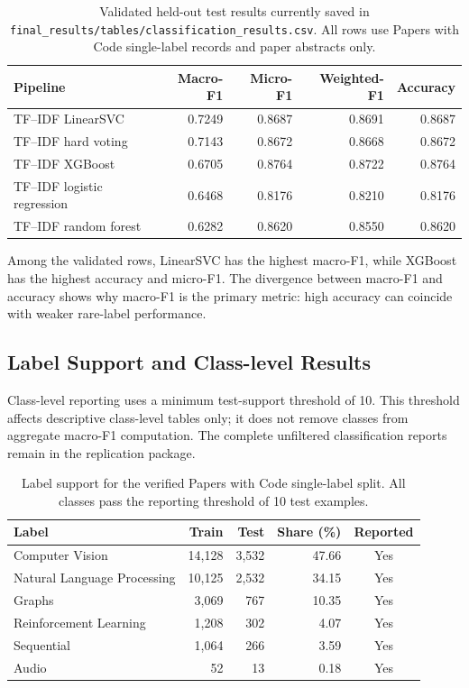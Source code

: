 \documentclass[pdflatex,sn-mathphys-num]{sn-jnl}
\theoremstyle{thmstyleone}%
\theoremstyle{thmstyletwo}%
\theoremstyle{thmstylethree}%
\begin{document}
\begin{table}[htbp]
\centering
\small
\caption{Validated held-out test results currently saved in \texttt{final\_results/tables/classification\_results.csv}. All rows use Papers with Code single-label records and paper abstracts only.}
\label{tab:verified-classification-results}
\begin{tabular}{lrrrr}
\toprule
Pipeline & Macro-F1 & Micro-F1 & Weighted-F1 & Accuracy \\
\midrule
TF--IDF LinearSVC & 0.7249 & 0.8687 & 0.8691 & 0.8687 \\
TF--IDF hard voting & 0.7143 & 0.8672 & 0.8668 & 0.8672 \\
TF--IDF XGBoost & 0.6705 & 0.8764 & 0.8722 & 0.8764 \\
TF--IDF logistic regression & 0.6468 & 0.8176 & 0.8210 & 0.8176 \\
TF--IDF random forest & 0.6282 & 0.8620 & 0.8550 & 0.8620 \\
\bottomrule
\end{tabular}
\end{table}

Among the validated rows, LinearSVC has the highest macro-F1, while XGBoost has the highest accuracy and micro-F1. The divergence between macro-F1 and accuracy shows why macro-F1 is the primary metric: high accuracy can coincide with weaker rare-label performance.

\subsection{Label Support and Class-level Results}
\label{subsec:error-analysis}

Class-level reporting uses a minimum test-support threshold of 10. This threshold affects descriptive class-level tables only; it does not remove classes from aggregate macro-F1 computation. The complete unfiltered classification reports remain in the replication package.

\begin{table}[htbp]
\centering
\small
\caption{Label support for the verified Papers with Code single-label split. All classes pass the reporting threshold of 10 test examples.}
\label{tab:label-support}
\begin{tabular}{lrrrc}
\toprule
Label & Train & Test & Share (\%) & Reported \\
\midrule
Computer Vision & 14,128 & 3,532 & 47.66 & Yes \\
Natural Language Processing & 10,125 & 2,532 & 34.15 & Yes \\
Graphs & 3,069 & 767 & 10.35 & Yes \\
Reinforcement Learning & 1,208 & 302 & 4.07 & Yes \\
Sequential & 1,064 & 266 & 3.59 & Yes \\
Audio & 52 & 13 & 0.18 & Yes \\
\bottomrule
\end{tabular}
\end{table}
\end{document}
